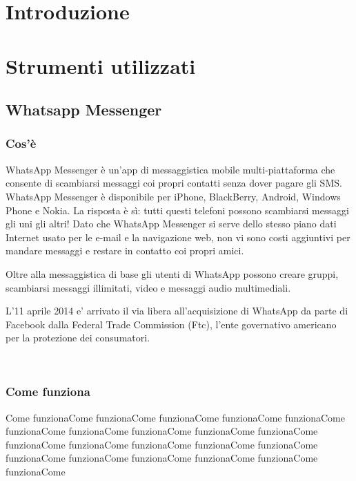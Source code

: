 \documentclass[a4paper,11pt]{book}
\begin{document}
\begin{frontespizio}
\end{frontespizio}


\tableofcontents

\chapter{Introduzione}


\chapter{Strumenti utilizzati}

\section{Whatsapp Messenger}
\subsection{Cos'è}
WhatsApp Messenger è un'app di messaggistica mobile multi-piattaforma che consente di scambiarsi messaggi coi propri contatti senza dover pagare gli SMS. WhatsApp Messenger è disponibile per iPhone, BlackBerry, Android, Windows Phone e Nokia. La risposta è sì: tutti questi telefoni possono scambiarsi messaggi gli uni gli altri! Dato che WhatsApp Messenger si serve dello stesso piano dati Internet usato per le e-mail e la navigazione web, non vi sono costi aggiuntivi per mandare messaggi e restare in contatto coi propri amici.

Oltre alla messaggistica di base gli utenti di WhatsApp possono creare gruppi, scambiarsi messaggi illimitati, video e messaggi audio multimediali.

L'11 aprile 2014 e' arrivato il via libera all'acquisizione di WhatsApp da parte di Facebook dalla Federal Trade Commission (Ftc), l'ente governativo americano per la protezione dei consumatori.

~

\subsection{Come funziona}
Come funzionaCome funzionaCome funzionaCome funzionaCome funzionaCome funzionaCome funzionaCome funzionaCome funzionaCome funzionaCome funzionaCome funzionaCome funzionaCome funzionaCome funzionaCome funzionaCome funzionaCome funzionaCome funzionaCome funzionaCome funzionaCome 
\end{document}
